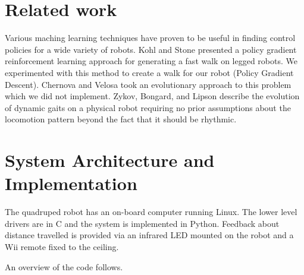 \section{Related work}

Various maching learning techniques have proven to be useful in
finding control policies for a wide variety of robots. Kohl and
Stone\cite{kohl} presented a policy gradient reinforcement learning
approach for generating a fast walk on legged robots. We experimented
with this method to create a walk for our robot (Policy Gradient
Descent). Chernova and Velosa\cite{chernova} took an evolutionary
approach to this problem which we did not implement.  Zykov, Bongard,
and Lipson\cite{zykov} describe the evolution of dynamic gaits on a
physical robot requiring no prior assumptions about the locomotion
pattern beyond the fact that it should be rhythmic.


\section{System Architecture and Implementation}

The quadruped robot has an on-board computer running Linux. The lower
level drivers are in C and the system is implemented in
Python. Feedback about distance travelled is provided via an infrared
LED mounted on the robot and a Wii remote fixed to the ceiling.

An overview of the code follows.

